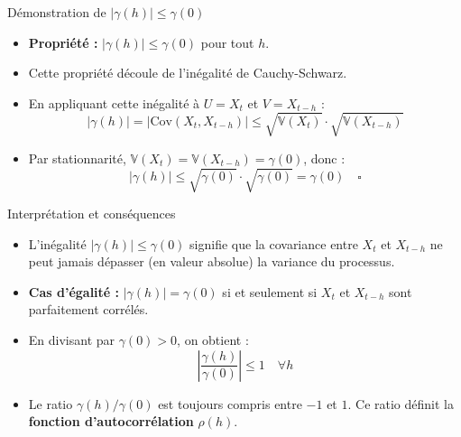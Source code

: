 \documentclass[11pt,aspectratio=169]{beamer}
\newcommand{\Var}{\mathbb{V}}
\newcommand{\Cov}{\mathrm{Cov}}
\begin{document}
\begin{frame}{Démonstration de $|\gamma(h)| \leq \gamma(0)$}

\begin{itemize}

\item \textbf{Propriété :} $|\gamma(h)| \leq \gamma(0)$ pour tout $h$.\newline

\item Cette propriété découle de l'inégalité de Cauchy-Schwarz.\newline

\item En appliquant cette inégalité à $U = X_t$ et $V = X_{t-h}$ :
  \[
  |\gamma(h)| = |\Cov(X_t, X_{t-h})| \leq \sqrt{\Var(X_t)} \cdot \sqrt{\Var(X_{t-h})}
  \]\newline

\item Par stationnarité, $\Var(X_t) = \Var(X_{t-h}) = \gamma(0)$, donc :
  \[
  |\gamma(h)| \leq \sqrt{\gamma(0)} \cdot \sqrt{\gamma(0)} = \gamma(0) \quad \square
  \]

\end{itemize}

\end{frame}

\begin{frame}{Interprétation et conséquences}

\begin{itemize}

\item L'inégalité $|\gamma(h)| \leq \gamma(0)$ signifie que la covariance entre $X_t$ et $X_{t-h}$ ne peut jamais dépasser (en valeur absolue) la variance du processus.\newline

\item \textbf{Cas d'égalité :} $|\gamma(h)| = \gamma(0)$ si et seulement si $X_t$ et $X_{t-h}$ sont parfaitement corrélés.\newline

\item En divisant par $\gamma(0) > 0$, on obtient :
  \[
  \left|\frac{\gamma(h)}{\gamma(0)}\right| \leq 1 \quad \forall h
  \]\newline

\item Le ratio $\gamma(h)/\gamma(0)$ est toujours compris entre $-1$ et $1$. Ce ratio définit la \textbf{fonction d'autocorrélation} $\rho(h)$.

\end{itemize}

\end{frame}
\end{document}
